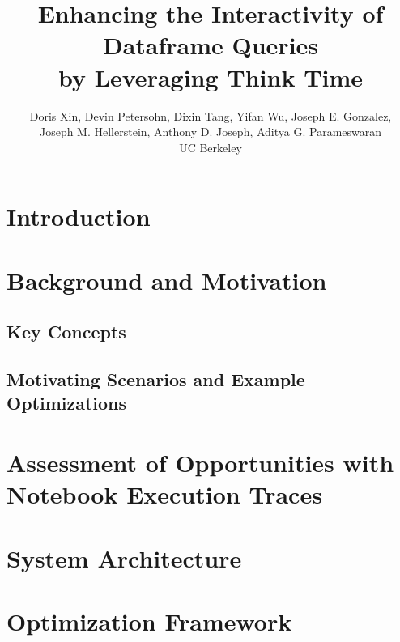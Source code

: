 \documentclass[11pt]{article}
\begin{document}
\title{Enhancing the Interactivity of Dataframe Queries \\ by Leveraging Think Time}

\author{Doris Xin, Devin Petersohn, Dixin Tang, Yifan Wu, Joseph E. Gonzalez, \\ Joseph M. Hellerstein, Anthony D. Joseph, Aditya G. Parameswaran \\ UC Berkeley}


\maketitle

\section{Introduction}



\section{Background and Motivation}

\subsection{Key Concepts}


\subsection{Motivating Scenarios and Example Optimizations}
\label{sec:tasks}


\section{Assessment of Opportunities with Notebook Execution Traces}
\label{sec:formative}


\section{System Architecture}
\label{sec:arch}


\section{Optimization Framework}
\label{sec:opt}

\end{document}
